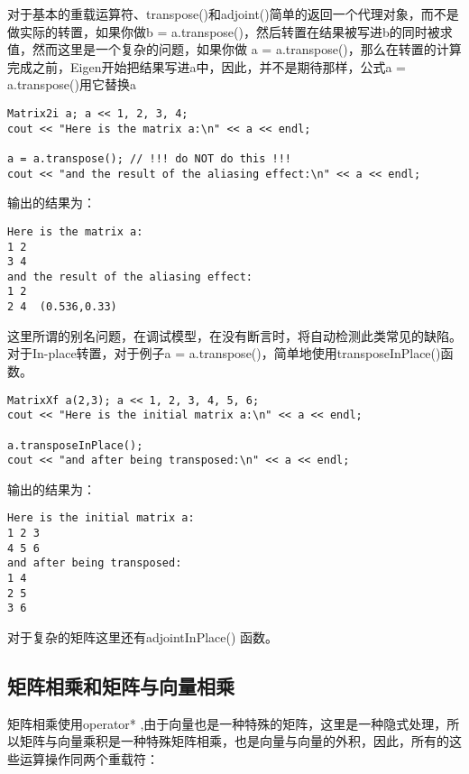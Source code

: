 对于基本的重载运算符、transpose()和adjoint()简单的返回一个代理对象，而不是做实际的转置，如果你做b = a.transpose()，然后转置在结果被写进b的同时被求值，然而这里是一个复杂的问题，如果你做 a = a.transpose()，那么在转置的计算完成之前，Eigen开始把结果写进a中，因此，并不是期待那样，公式a = a.transpose()用它替换a

\begin{lstlisting}[style=Cpp]
Matrix2i a; a << 1, 2, 3, 4;
cout << "Here is the matrix a:\n" << a << endl;

a = a.transpose(); // !!! do NOT do this !!!
cout << "and the result of the aliasing effect:\n" << a << endl;
\end{lstlisting}
输出的结果为：
\begin{lstlisting}
Here is the matrix a:
1 2
3 4
and the result of the aliasing effect:
1 2
2 4  (0.536,0.33)
\end{lstlisting}

这里所谓的别名问题，在调试模型，在没有断言时，将自动检测此类常见的缺陷。
对于In-place转置，对于例子a = a.transpose()，简单地使用transposeInPlace()函数。
\begin{lstlisting}[style=Cpp]
MatrixXf a(2,3); a << 1, 2, 3, 4, 5, 6;
cout << "Here is the initial matrix a:\n" << a << endl;

a.transposeInPlace();
cout << "and after being transposed:\n" << a << endl;
\end{lstlisting}
输出的结果为：
\begin{lstlisting}
Here is the initial matrix a:
1 2 3
4 5 6
and after being transposed:
1 4
2 5
3 6
\end{lstlisting}
对于复杂的矩阵这里还有adjointInPlace() 函数。

\subsection{ 矩阵相乘和矩阵与向量相乘}

矩阵相乘使用operator* ,由于向量也是一种特殊的矩阵，这里是一种隐式处理，所以矩阵与向量乘积是一种特殊矩阵相乘，也是向量与向量的外积，因此，所有的这些运算操作同两个重载符：

